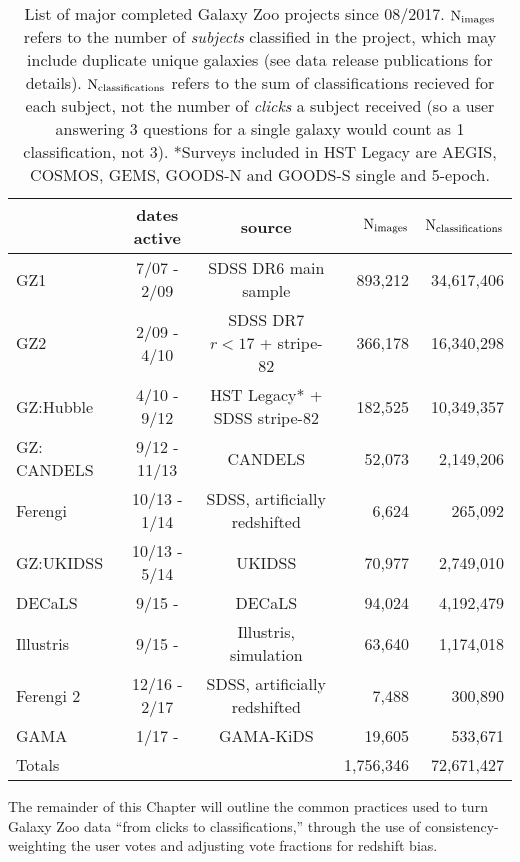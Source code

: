 \begin{table}
\rotate
\caption{List of major completed Galaxy Zoo projects since 08/2017. $\rm N_{images}$ refers to the number of \emph{subjects} classified in the project, which may include duplicate unique galaxies (see data release publications for details). $\rm N_{classifications}$ refers to the sum of classifications recieved for each subject, not the number of \emph{clicks} a subject received (so a user answering 3 questions for a single galaxy would count as 1 classification, not 3). *Surveys included in HST Legacy are AEGIS, COSMOS, GEMS, GOODS-N and GOODS-S single and 5-epoch. }\label{tab:project_summary}
\begin{tabular}{lccrr}
\hline\hline
                    & dates active &  source 			   & $\rm N_{images}$ & $\rm N_{classifications}$   \\
\hline
GZ1        	    & 7/07 - 2/09  & SDSS DR6 main sample          & 893,212 	      & 34,617,406 \\
GZ2      	    & 2/09 - 4/10  & SDSS DR7 $r < 17$ + stripe-82 & 366,178          & 16,340,298 \\
GZ:Hubble           & 4/10 - 9/12  & HST Legacy* + SDSS stripe-82  & 182,525          & 10,349,357 \\
GZ: CANDELS         & 9/12 - 11/13 & CANDELS   			   & 52,073           & 2,149,206 \\
Ferengi             & 10/13 - 1/14 & SDSS, artificially redshifted & 6,624            & 265,092 \\
GZ:UKIDSS           & 10/13 - 5/14 & UKIDSS   			   & 70,977           & 2,749,010 \\ 
DECaLS              & 9/15 -       & DECaLS			   & 94,024	      & 4,192,479  \\
Illustris           & 9/15 -       & Illustris, simulation         & 63,640           & 1,174,018  \\
Ferengi 2           & 12/16 - 2/17 & SDSS, artificially redshifted & 7,488            & 300,890 \\
GAMA                & 1/17 -       & GAMA-KiDS			   & 19,605           &	533,671	\\
\hline
Totals		    &		   & 				   & 1,756,346        & 72,671,427\\
\hline
\hline
\end{tabular}
\end{table}


The remainder of this Chapter will outline the common practices used to turn Galaxy Zoo data ``from clicks to classifications,'' through the use of consistency-weighting the user votes and adjusting vote fractions for redshift bias. 

